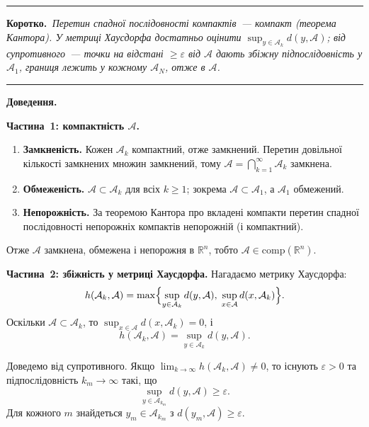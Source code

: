 \documentclass[12pt,a4paper]{article}
\newenvironment{korotko}
  {\par\medskip\noindent\begingroup\color{accent!75!black}\rule{\linewidth}{0.4pt}\par
   \noindent\textbf{Коротко.}\itshape\,}
  {\par\noindent\rule{\linewidth}{0.4pt}\endgroup\medskip}
\begin{document}
\begin{korotko}
Перетин спадної послідовності компактів~--- компакт (теорема Кантора).
У метриці Хаусдорфа достатньо оцінити $\sup_{y\in\mathcal{A}_k}d(y,\mathcal{A})$;
від супротивного~--- точки на відстані $\ge\varepsilon$ від $\mathcal{A}$ дають
збіжну підпослідовність у $\mathcal{A}_1$, границя лежить у кожному $\mathcal{A}_N$,
отже в $\mathcal{A}$.
\end{korotko}

\noindent\textbf{Доведення.}

\noindent\textbf{Частина~1: компактність $\mathcal{A}$.}
\begin{enumerate}[leftmargin=1.6em,itemsep=0.25em]
  \item \textbf{Замкненість.} Кожен $\mathcal{A}_k$ компактний, отже замкнений.
        Перетин довільної кількості замкнених множин замкнений, тому
        $\mathcal{A}=\bigcap_{k=1}^{\infty}\mathcal{A}_k$ замкнена.
  \item \textbf{Обмеженість.} $\mathcal{A}\subset\mathcal{A}_k$ для всіх $k\ge1$;
        зокрема $\mathcal{A}\subset\mathcal{A}_1$, а $\mathcal{A}_1$ обмежений.
  \item \textbf{Непорожність.} За теоремою Кантора про вкладені компакти перетин
        спадної послідовності непорожніх компактів непорожній (і компактний).
\end{enumerate}
Отже $\mathcal{A}$ замкнена, обмежена і непорожня в $\mathbb{R}^n$, тобто
$\mathcal{A}\in\mathrm{comp}(\mathbb{R}^n)$.

\noindent\textbf{Частина~2: збіжність у метриці Хаусдорфа.}
Нагадаємо метрику Хаусдорфа:
\begin{equation*}
  h(\mathcal{A}_k,\mathcal{A})
  =\max\Bigl\{\sup_{y\in\mathcal{A}_k}d(y,\mathcal{A}),\;
  \sup_{x\in\mathcal{A}}d(x,\mathcal{A}_k)\Bigr\}.
\end{equation*}
Оскільки $\mathcal{A}\subset\mathcal{A}_k$, то $\sup_{x\in\mathcal{A}}d(x,\mathcal{A}_k)=0$, і
\begin{equation*}
  h(\mathcal{A}_k,\mathcal{A})=\sup_{y\in\mathcal{A}_k}d(y,\mathcal{A}).
\end{equation*}

Доведемо від супротивного. Якщо $\lim_{k\to\infty}h(\mathcal{A}_k,\mathcal{A})\neq0$,
то існують $\varepsilon>0$ та підпослідовність $k_m\to\infty$ такі, що
\begin{equation*}
  \sup_{y\in\mathcal{A}_{k_m}}d(y,\mathcal{A})\ge\varepsilon.
\end{equation*}
Для кожного $m$ знайдеться $y_m\in\mathcal{A}_{k_m}$ з $d(y_m,\mathcal{A})\ge\varepsilon$.
\end{document}
